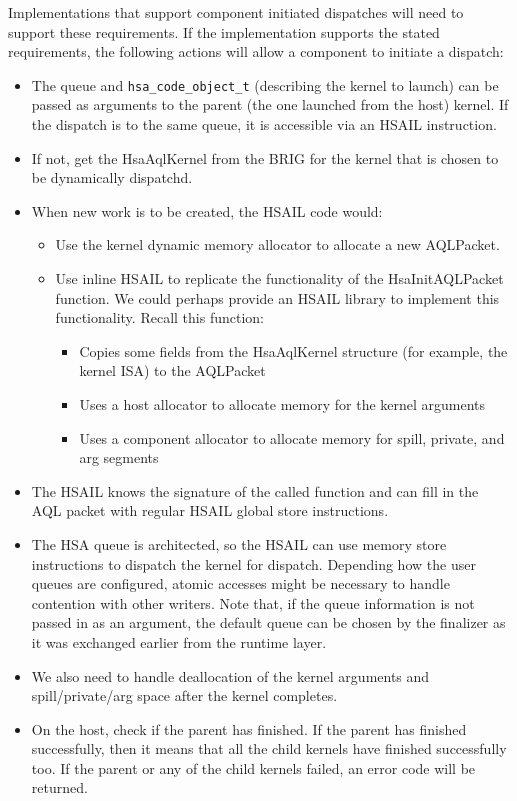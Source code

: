\documentclass{book}
\begin{document}
\begin{appendices}
Implementations that support component initiated dispatches will
need to support these requirements. If the implementation supports
the stated requirements, the following actions will allow a
component to initiate a dispatch\-:
\begin{itemize}
\item The queue and \texttt{hsa\_code\_object\_t} (describing the
kernel to launch) can be passed as arguments to the parent (the one
launched from the host) kernel. If the dispatch is to the same
queue, it is accessible via an HSAIL instruction.
\item If not, get the Hsa\-Aql\-Kernel from the B\-R\-I\-G for the
kernel that is chosen to be dynamically dispatchd.
\item When new work is to be created, the H\-S\-A\-I\-L code would\-:
\begin{itemize}
\item Use the kernel dynamic memory allocator to allocate a new
A\-Q\-L\-Packet.
\item Use inline H\-S\-A\-I\-L to replicate the functionality of the
Hsa\-Init\-A\-Q\-L\-Packet function. We could perhaps provide an
H\-S\-A\-I\-L library to implement this functionality. Recall this
function\-:
\begin{itemize}
\item Copies some fields from the Hsa\-Aql\-Kernel structure (for
example, the kernel I\-S\-A) to the A\-Q\-L\-Packet
\item Uses a host allocator to allocate memory for the kernel
arguments
\item Uses a component allocator to allocate memory for spill,
private, and arg segments
\end{itemize}
\end{itemize}
\item The H\-S\-A\-I\-L knows the signature of the called function
and can fill in the A\-Q\-L packet with regular H\-S\-A\-I\-L global
store instructions.
\item The H\-S\-A queue is architected, so the H\-S\-A\-I\-L can use
memory store instructions to dispatch the kernel for dispatch.
Depending how the user queues are configured, atomic accesses might
be necessary to handle contention with other writers. Note that, if
the queue information is not passed in as an argument, the default
queue can be chosen by the finalizer as it was exchanged earlier
from the runtime layer.
\item We also need to handle deallocation of the kernel arguments
and spill/private/arg space after the kernel completes.
\item On the host, check if the parent has finished. If the parent
has finished successfully, then it means that all the child kernels
have finished successfully too. If the parent or any of the child
kernels failed, an error code will be returned.
\end{itemize}


\end{appendices}
\end{document}
